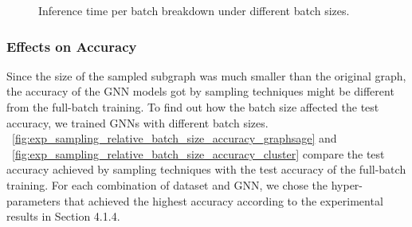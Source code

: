 \begin{figure}[H]
   \centering
   \caption{Inference time per batch breakdown under different batch sizes.}
   \label{fig:time_breakdown_of_inference_sampler}
\end{figure}

\subsubsection{Effects on Accuracy}

Since the size of the sampled subgraph was much smaller than the original graph, the accuracy of the GNN models got by sampling techniques might be different from the full-batch training.
%
To find out how the batch size affected the test accuracy, we trained GNNs with different batch sizes.
%
\figurename~\ref{fig:exp_sampling_relative_batch_size_accuracy_graphsage} and \figurename~\ref{fig:exp_sampling_relative_batch_size_accuracy_cluster} compare the test accuracy achieved by sampling techniques with the test accuracy of the full-batch training.
%
For each combination of dataset and GNN, we chose the hyper-parameters that achieved the highest accuracy according to the experimental results in Section 4.1.4.

